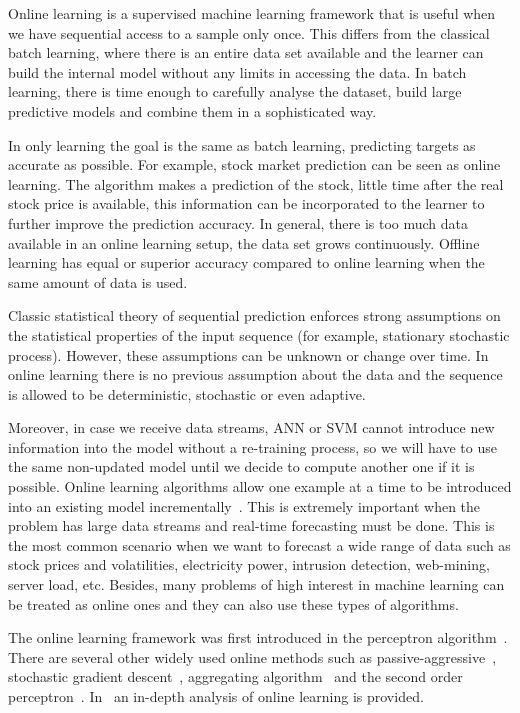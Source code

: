 Online learning is a supervised machine learning framework that is useful when we have sequential access to a sample only once.  This differs from the classical batch learning, where there is an entire data set available and the learner can build the internal model without any limits in accessing the data. In batch learning, there is time enough to carefully analyse the dataset, build large predictive models and combine them in a sophisticated way. 

In only learning the goal is the same as batch learning, predicting targets as accurate as possible. For example, stock market prediction can be seen as online learning. The algorithm makes a prediction of the stock, little time after the real stock price is available, this information can be incorporated to the learner to further improve the prediction accuracy. In general, there is too much data available in an online learning setup, the data set grows continuously. Offline learning has equal or superior accuracy compared to online learning when the same amount of data is used.

Classic statistical theory of sequential prediction enforces strong assumptions on the statistical properties of the input sequence (for example, stationary stochastic process). However, these assumptions can be unknown or change over time. In online learning there is no previous assumption about the data and the sequence is allowed to be deterministic, stochastic or even adaptive.  

Moreover, in case we receive data streams, ANN or SVM cannot introduce new information into the model without a re-training process, so we will have to use the same non-updated model until we decide to compute another one if it is possible.  Online learning algorithms allow one example at a time to be introduced into an existing model incrementally~\cite{vovk2005}. This is extremely important when the problem has large data streams and real-time forecasting must be done.  This is the most common scenario when we want to forecast a wide range of data such as stock prices and volatilities, electricity power, intrusion detection, web-mining, server load, etc.  Besides, many problems of high interest in machine learning can be treated as online ones and they can also use these types of algorithms.

The online learning framework was first introduced in the perceptron algorithm~\cite{rosenblatt58}. There are several other widely used online methods such as passive-aggressive~\cite{crammerETall2006}, stochastic gradient descent~\cite{zhang2004}, aggregating algorithm~\cite{vovk2001} and the second order perceptron~\cite{cesa-bianchi2005}.  In~\cite{cesa-bianchi2006} an in-depth analysis of online learning is provided.

